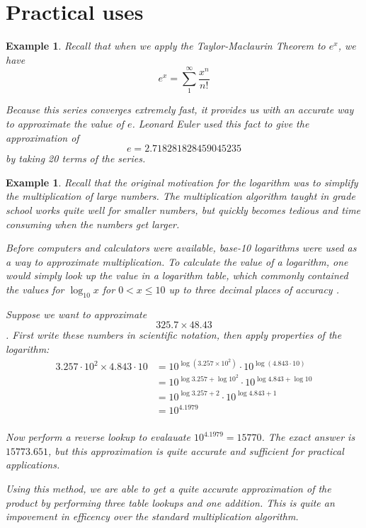 \documentclass[12pt]{article}
\theoremstyle{mystyle}
\newtheorem{example}[thm]{Example}
\begin{document}
\section{Practical uses}

\begin{example}
  Recall that when we apply the Taylor-Maclaurin Theorem to $e^x$, we have
  $$ e^x = \sum_1^\infty \frac{x^n}{n!} $$
  
  Because this series converges extremely fast, it provides us with an accurate
  way to approximate the value of $e$. Leonard Euler used this fact to give
  the approximation of
  $$ e = 2.718281828459045235 $$
  by taking 20 terms of the series. \cite{USAS}
\end{example}


\begin{example}
  Recall that the original motivation for the logarithm was to simplify the
  multiplication of large numbers. The multiplication algorithm taught in grade
  school works quite well for smaller numbers, but quickly becomes tedious and
  time consuming when the numbers get larger. 
  
  Before computers and calculators were available, base-10 logarithms were used
  as a way to approximate multiplication. To calculate the value of a
  logarithm, one would simply look up the value in a logarithm table, which
  commonly contained the values for $\log_{10} x$ for $0 < x \leq 10$ up to
  three decimal places of accuracy \cite[Remark 6.3]{howie}.
  
  Suppose we want to approximate 
  $$325.7 \times 48.43$$. 
  First write these numbers in scientific notation, then apply properties of
  the logarithm:
  \begin{align*}
    3.257 \cdot 10^2 \times 4.843 \cdot 10 
      &= 10^{\log(3.257 \times 10 ^2)} \cdot  10^{\log(4.843 \cdot 10)} \\
      &= 10^{\log 3.257 + \log 10^2} \cdot  10^{\log 4.843 + \log 10} \\
      &= 10^{\log 3.257 + 2} \cdot  10^{\log 4.843 + 1} \\
      &= 10^{4.1979} \\
  \end{align*}
  
  Now perform a reverse lookup to evalauate $10^4.1979 = 15770$. The exact
  answer is $15773.651$, but this approximation is quite accurate and sufficient
  for practical applications.
  
  Using this method, we are able to get a quite accurate approximation of the
  product by performing three table lookups and one addition. This is quite an
  impovement in efficency over the standard multiplication algorithm.
\end{example}
\end{document}
